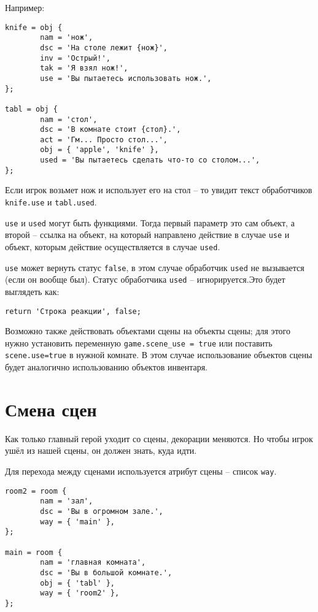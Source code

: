 \documentclass[a4paper,12pt]{article}
\begin{document}
Например:

\begin{verbatim}
knife = obj {
        nam = 'нож',
        dsc = 'На столе лежит {нож}',
        inv = 'Острый!',
        tak = 'Я взял нож!',
        use = 'Вы пытаетесь использовать нож.',
};

tabl = obj {
        nam = 'стол',
        dsc = 'В комнате стоит {стол}.',
        act = 'Гм... Просто стол...',
        obj = { 'apple', 'knife' },
        used = 'Вы пытаетесь сделать что-то со столом...',
};
\end{verbatim}

Если игрок возьмет нож и использует его на стол -- то увидит текст обработчиков \verb/knife.use/ и \verb/tabl.used/.

\verb/use/ и \verb/used/ могут быть функциями. Тогда первый параметр это сам объект, а второй -- ссылка на объект, на который направлено действие в случае \verb/use/ и объект, которым действие осуществляется в случае \verb/used/.

\verb/use/ может вернуть статус \verb/false/, в этом случае обработчик \verb/used/ не вызывается (если он вообще был). Статус обработчика \verb/used/ -- игнорируется.Это будет выглядеть как:

\begin{verbatim}
return 'Строка реакции', false;
\end{verbatim}

Возможно также действовать объектами сцены на объекты сцены; для этого нужно установить переменную \verb/game.scene_use = true/ или поставить \verb/scene.use=true/ в нужной комнате. В этом случае использование объектов сцены будет аналогично использованию объектов инвентаря.

\section{Смена сцен}

Как только главный герой уходит со сцены, декорации меняются. Но чтобы игрок ушёл из нашей сцены, он должен знать, куда идти.

Для перехода между сценами используется атрибут сцены -- список \verb/way/.

\begin{verbatim}
room2 = room {
        nam = 'зал',
        dsc = 'Вы в огромном зале.',
        way = { 'main' },
};

main = room {
        nam = 'главная комната',
        dsc = 'Вы в большой комнате.',
        obj = { 'tabl' },
        way = { 'room2' },
};
\end{verbatim}
\end{document}
